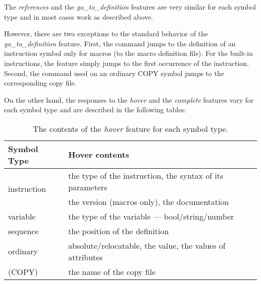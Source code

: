 The \emph{references} and the \emph{go\_to\_definition} features are very similar for each symbol type and in most cases work as described above. 

However, there are two exceptions to the standard behavior of the \emph{go\_to\_definition} feature.
First, the command jumps to the definition of an instruction symbol only for macros (to the macro definition file). For the built-in instructions, the feature simply jumps to the first occurrence of the instruction. Second, the command used on an ordinary COPY symbol jumps to the corresponding copy file.

On the other hand, the responses to the \emph{hover} and the \emph{complete} features vary for each symbol type and are described in the following tables:
\begin{table}[h]
	\centering
	\begin{tabular}{ll}
		\toprule
		\textbf{Symbol Type}            & \textbf{Hover contents}                              \\ \midrule
		\multirow{2}{4cm}{instruction}  & the type of the instruction, the syntax of its parameters \\ 
		                                & the version (macros only), the documentation \\ \midrule
		variable                        & the type of the variable --- bool/string/number       \\ \midrule
		sequence                        & the position of the definition                \\ \midrule
		ordinary                        & absolute/relocatable, the value, the values of attributes \\
		(COPY)                          & the name of the copy file                               \\  
		\bottomrule
	\end{tabular}
	\caption{The contents of the \emph{hover} feature for each symbol type.}
\end{table}

